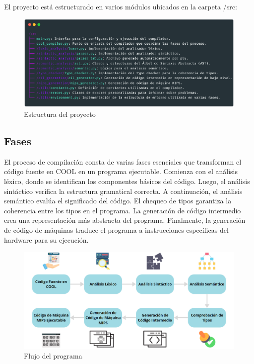 \documentclass[10pt]{article} %
\begin{document}
	El proyecto está estructurado en varios módulos ubicados en la carpeta /src:
	
	\begin{figure}[H]
		\centering
		\includegraphics[width=15cm]{structure}
		\caption{Estructura del proyecto}
	\end{figure}

	\subsection{Fases}
	
	El proceso de compilación consta de varias fases esenciales que transforman el código fuente en COOL en un programa ejecutable. Comienza con el análisis léxico, donde se identifican los componentes básicos del código. Luego, el análisis sintáctico verifica la estructura gramatical correcta. A continuación, el análisis semántico evalúa el significado del código. El chequeo de tipos garantiza la coherencia entre los tipos en el programa. La generación de código intermedio crea una representación más abstracta del programa. Finalmente, la generación de código de máquinas traduce el programa a instrucciones específicas del hardware para su ejecución. 
	
	\begin{figure}[H]
		\centering
		\includegraphics[width=13.5cm]{flow}
		\caption{Flujo del programa}
	\end{figure}
	
\end{document}
